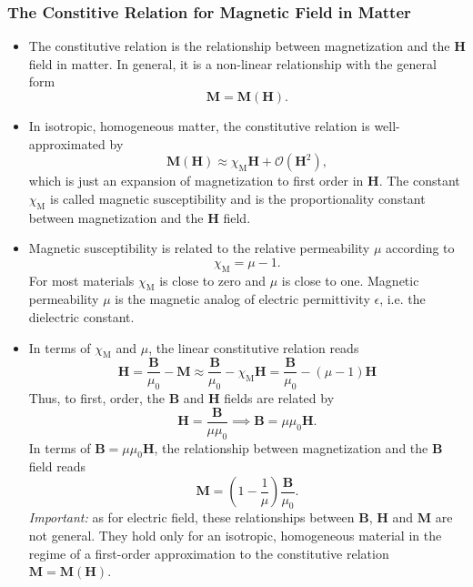 \documentclass[11pt, a4paper]{article}
\renewcommand{\vec}[1]{\bm{#1}} %
\newcommand{\B}{\vec{B}} %
\renewcommand{\H}{\vec{H}}  %
\newcommand{\M}{\vec{M}}  %
\newcommand{\mm}{\mu_{0}}  %
\begin{document}
\subsubsection{The Constitive Relation for Magnetic Field in Matter} \label{sss:const-rel-magnetic}
\begin{itemize}

    \item The constitutive relation is the relationship between magnetization and the $ \H $ field in matter. In general, it is a non-linear relationship with the general form
	\begin{equation*}
		\M = \M(\H).
	\end{equation*}


    \item In isotropic, homogeneous matter, the constitutive relation is well-approximated by
	\begin{equation*}
		\M(\H) \approx \chi_{\text{M}} \H + \mathcal{O}(\H^{2}),
	\end{equation*}
    which is just an expansion of magnetization to first order in $ \H $. The constant $ \chi_{\text{M}} $ is called magnetic susceptibility and is the proportionality constant between magnetization and the $ \H $ field.

    \item Magnetic susceptibility is related to the relative permeability $ \mu $ according to
	\begin{equation*}
        \chi_{\text{M}} = \mu - 1.
	\end{equation*}
    For most materials $ \chi_{\text{M}} $ is close to zero and $ \mu $ is close to one. Magnetic permeability $ \mu $ is the magnetic analog of electric permittivity $ \epsilon $, i.e. the dielectric constant.
	
	\item In terms of $ \chi_{\text{M}} $ and $ \mu $, the linear constitutive relation reads
	\begin{equation*}
        \H = \frac{\B}{\mm} - \M \approx \frac{\B}{\mm} - \chi_{\text{M}} \H = \frac{\B}{\mm} - (\mu - 1)\H
	\end{equation*}
    Thus, to first, order, the $ \B $ and $ \H $ fields are related by
	\begin{equation*}
        \H = \frac{\B}{\mu \mm} \implies \B = \mu \mm \H.
	\end{equation*}
    In terms of $ \B = \mu \mm \H $, the relationship between magnetization and the $ \B $ field reads
	\begin{equation*}
        \M = \left( 1 - \frac{1}{\mu} \right)\frac{\B}{\mm}.
	\end{equation*}
    \textit{Important:} as for electric field, these relationships between $ \B $, $ \H $ and $ \M $ are not general. They hold only for an isotropic, homogeneous material in the regime of a first-order approximation to the constitutive relation $ \M = \M(\H) $.

\end{itemize}
\end{document}
